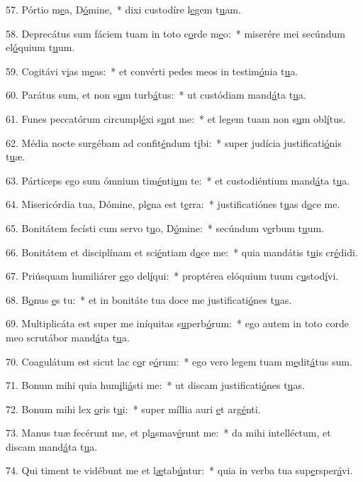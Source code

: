 57. Pórtio m\uline{e}a, D\uline{ó}mine,~* dixi custodíre l\uline{e}gem t\uline{u}am.\par 
58. Deprecátus sum fáciem tuam in toto c\uline{o}rde m\uline{e}o:~* miserére mei secúndum el\uline{ó}quium t\uline{u}um.\par 
59. Cogitávi v\uline{i}as m\uline{e}as:~* et convérti pedes meos in testim\uline{ó}nia t\uline{u}a.\par 
60. Parátus sum, et non s\uline{u}m turb\uline{á}tus:~* ut custódiam mand\uline{á}ta t\uline{u}a.\par 
61. Funes peccatórum circumpl\uline{é}xi s\uline{u}nt me:~* et legem tuam non s\uline{u}m obl\uline{í}tus.\par 
62. Média nocte surgébam ad confit\uline{é}ndum t\uline{i}bi:~* super judícia justificati\uline{ó}nis t\uline{u}æ.\par 
63. Párticeps ego sum ómnium tim\uline{é}nti\uline{u}m te:~* et custodiéntium mand\uline{á}ta t\uline{u}a.\par 
64. Misericórdia tua, Dómine, pl\uline{e}na est t\uline{e}rra:~* justificatiónes t\uline{u}as d\uline{o}ce me.\par 
65. Bonitátem fecísti cum servo t\uline{u}o, D\uline{ó}mine:~* secúndum v\uline{e}rbum t\uline{u}um.\par 
66. Bonitátem et disciplínam et sci\uline{é}ntiam d\uline{o}ce me:~* quia mandátis t\uline{u}is cr\uline{é}didi.\par 
67. Priúsquam humiliárer \uline{e}go del\uline{í}qui:~* proptérea elóquium tuum c\uline{u}stod\uline{í}vi.\par 
68. B\uline{o}nus \uline{e}s tu:~* et in bonitáte tua doce me justificati\uline{ó}nes t\uline{u}as.\par 
69. Multiplicáta est super me iníquitas s\uline{u}perb\uline{ó}rum:~* ego autem in toto corde meo scrutábor mand\uline{á}ta t\uline{u}a.\par 
70. Coagulátum est sicut lac c\uline{o}r e\uline{ó}rum:~* ego vero legem tuam m\uline{e}dit\uline{á}tus sum.\par 
71. Bonum mihi quia hum\uline{i}li\uline{á}sti me:~* ut discam justificati\uline{ó}nes t\uline{u}as.\par 
72. Bonum mihi lex \uline{o}ris t\uline{u}i:~* super míllia auri \uline{e}t arg\uline{é}nti.\par 
73. Manus tuæ fecérunt me, et pl\uline{a}smav\uline{é}runt me:~* da mihi intelléctum, et discam mand\uline{á}ta t\uline{u}a.\par 
74. Qui timent te vidébunt me et l\uline{æ}tab\uline{ú}ntur:~* quia in verba tua sup\uline{e}rsper\uline{á}vi.\par 
